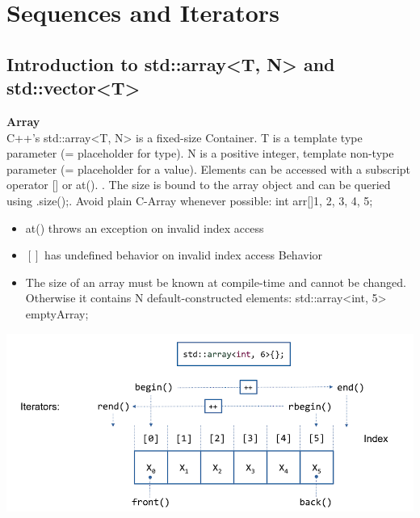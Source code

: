 
\section{Sequences and Iterators}
\subsection{Introduction to std::array<T, N> and std::vector<T>}
\textbf{Array}\\
C++'s std::array<T, N> is a fixed-size Container.  T is a template type parameter (= placeholder for type). N is a positive integer, template non-type parameter (= placeholder for a value). Elements can be accessed with a subscript operator [] or at(). . The size is bound to the array object and can be queried using .size();. Avoid plain C-Array whenever possible: int arr[]{1, 2, 3, 4, 5};
\begin{itemize}
  \itemsep -0.5em 
  \item at() throws an exception on invalid index access
  \item $[]$ has undefined behavior on invalid index access Behavior
  \item The size of an array must be known at compile-time and cannot be changed. Otherwise it contains N default-constructed elements: std::array<int, 5> emptyArray{};
\end{itemize}
\begin{center}
\includegraphics[width=0.75\linewidth]{images/array}
\end{center}

